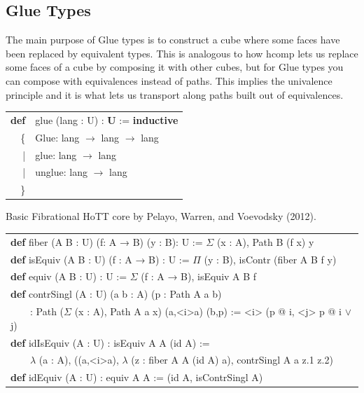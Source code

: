 \documentclass[a4paper,UKenglish,cleveref, autoref, thm-restate]{lipics-v2021}
\newcommand{\tabstyle}[0]{\scriptsize\ttfamily\fontseries{l}\selectfont}
\begin{document}
\newpage
\subsection{Glue Types}

The main purpose of Glue types is to construct a cube where some faces have
been replaced by equivalent types. This is analogous to how hcomp lets us
replace some faces of a cube by composing it with other cubes, but for Glue
types you can compose with equivalences instead of paths. This implies the
univalence principle and it is what lets us transport along paths built
out of equivalences.

\begin{table}[ht!]
\tabstyle
\begin{tabular}{rl}
     \textbf{def} & glue (lang : U) : \textbf{U} := \textbf{inductive} \\
 \{ & Glue: lang $\rightarrow$ lang $\rightarrow$ lang \\
  |& glue: lang $\rightarrow$ lang \\
  |& unglue: lang $\rightarrow$ lang \\
                         \} & \\
\end{tabular}
\end{table}

Basic Fibrational HoTT core by Pelayo, Warren, and Voevodsky (2012).

\begin{table}[ht!]
\tabstyle
\begin{tabular}{l}
\textbf{def} fiber (A B : U) (f: A → B) (y : B): U := $\Sigma$ (x : A), Path B (f x) y\\
\textbf{def} isEquiv (A B : U) (f : A → B) : U := $\Pi$ (y : B), isContr (fiber A B f y) \\
\textbf{def} equiv (A B : U) : U := $\Sigma$ (f : A → B), isEquiv A B f \\
\textbf{def} contrSingl (A : U) (a b : A) (p : Path A a b) \\
\ \ \ \ : Path ($\Sigma$ (x : A), Path A a x) (a,<i>a) (b,p) := <i> (p @ i, <j> p @ i $\vee$ j) \\
\textbf{def} idIsEquiv (A : U) : isEquiv A A (id A) := \\
\ \ \ \ $\lambda$ (a : A), ((a,<i>a), $\lambda$ (z : fiber A A (id A) a), contrSingl A a z.1 z.2) \\
\textbf{def} idEquiv (A : U) : equiv A A := (id A, isContrSingl A) \\
\end{tabular}
\end{table}
\end{document}
